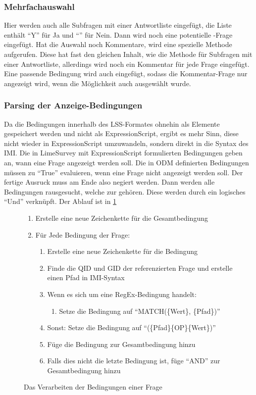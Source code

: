 \subsubsection{Mehrfachauswahl}

Hier werden auch alle Subfragen mit einer Antwortliste eingefügt, die Liste enthält \enquote{Y} für Ja und \enquote{} für Nein.
Dann wird noch eine potentielle -Frage eingefügt.
Hat die Auswahl noch Kommentare, wird eine spezielle Methode aufgerufen.
Diese hat fast den gleichen Inhalt, wie die Methode für Subfragen mit einer Antwortliste, allerdings wird noch ein Kommentar für jede Frage eingefügt.
Eine passende Bedingung wird auch eingefügt, sodass die Kommentar-Frage nur angezeigt wird, wenn die Möglichkeit auch ausgewählt wurde.


\subsubsection{Parsing der Anzeige-Bedingungen}
\label{im:cond}

Da die Bedingungen innerhalb des LSS-Formates ohnehin als Elemente gespeichert werden und nicht als ExpressionScript, ergibt es mehr Sinn, diese nicht wieder in ExpressionScript umzuwandeln, sondern direkt in die Syntax des IMI.
Die in LimeSurvey mit ExpressionScript formulierten Bedingungen geben an, wann eine Frage angezeigt werden soll.
Die in ODM definierten Bedingungen müssen zu \enquote{True} evaluieren, wenn eine Frage nicht angezeigt werden soll.
Der fertige Ausruck muss am Ende also negiert werden.
Dann werden alle Bedingungen rausgesucht, welche zur  gehören.
Diese werden durch ein logisches \enquote{Und} verknüpft.
Der Ablauf ist in \cref{fig:cond_im}

\begin{figure}[h]
	\begin{enumerate}
		\item Erstelle eine neue Zeichenkette für die Gesamtbedingung
		\item Für Jede Bedingung der Frage:
			\begin{enumerate}
				\item Erstelle eine neue Zeichenkette für die Bedingung
				\item Finde die QID und GID der referenzierten Frage und erstelle einen Pfad in IMI-Syntax
				\item Wenn es sich um eine RegEx-Bedingung handelt:
					\begin{enumerate}
						\item Setze die Bedingung auf \enquote{MATCH(\{Wert\}, \{Pfad\})} 
					\end{enumerate}
				\item Sonst: Setze die Bedingung auf \enquote{(\{Pfad\}\{OP\}\{Wert\})}
				\item Füge die Bedingung zur Gesamtbedingung hinzu
				\item Falls dies nicht die letzte Bedingung ist, füge \enquote{AND} zur Gesamtbedingung hinzu
			\end{enumerate}
	\end{enumerate}
	\caption{Das Verarbeiten der Bedingungen einer Frage}
	\label{fig:cond_im}
\end{figure}

